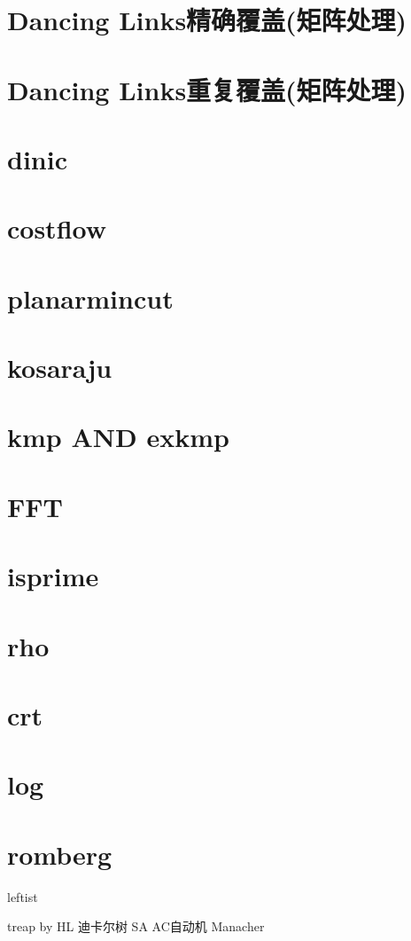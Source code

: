 \documentclass[
	10pt,
	twocolumn,
	a4paper,
]{article}
\begin{document}
\section{Dancing Links精确覆盖(矩阵处理)}

\section{Dancing Links重复覆盖(矩阵处理)}

\section{dinic}

\section{costflow}

\section{planarmincut}

\section{kosaraju}

\section{kmp AND exkmp}

\section{FFT}

\section{isprime}

\section{rho}

\section{crt}

\section{log}

\section{romberg}



leftist

treap by HL
迪卡尔树
SA
AC自动机
Manacher
\end{document}
